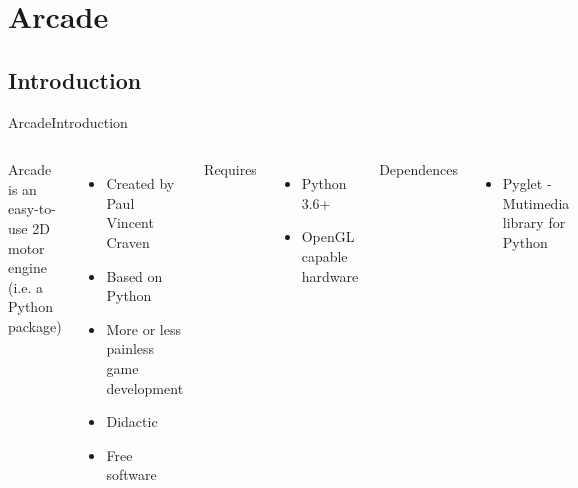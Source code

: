 \documentclass[10pt,compress]{beamer} %
\begin{document}
\section{Arcade}
\subsection{Introduction}

\begin{frame}{Arcade}{Introduction}
	\begin{columns}
		Arcade is an easy-to-use 2D motor engine (i.e. a Python package)
            \begin{itemize}
		\item Created by Paul Vincent Craven
                \item Based on Python
                \item More or less painless game development
                \item Didactic
                \item Free software
            \end{itemize}

        	Requires
            \begin{itemize}
                \item Python 3.6+
                \item OpenGL capable hardware
            \end{itemize}

            Dependences
            \begin{itemize}
                \item Pyglet - Mutimedia library for Python
            \end{itemize}


\end{columns}
\end{frame}
\end{document}
